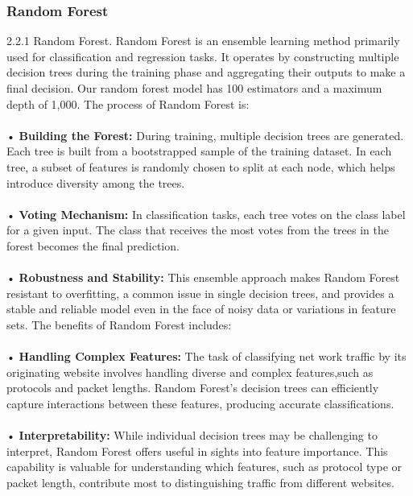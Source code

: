 \documentclass[10pt,sigconf,letterpaper,nonacm]{acmart}
\begin{document}
\subsubsection{Random Forest}
2.2.1 Random Forest. Random Forest is an ensemble learning method primarily used for classification and regression
tasks. It operates by constructing multiple decision trees during the training phase and aggregating their outputs to make
a final decision. Our random forest model has 100 estimators and a maximum depth of 1,000.
The process of Random Forest is:\\\\
• \textbf{Building the Forest:} During training, multiple decision
trees are generated. Each tree is built from a bootstrapped
sample of the training dataset. In each tree, a subset of
features is randomly chosen to split at each node, which
helps introduce diversity among the trees.\\\\
• \textbf{Voting Mechanism:} In classification tasks, each tree votes
on the class label for a given input. The class that receives
the most votes from the trees in the forest becomes the
final prediction.\\\\
• \textbf{Robustness and Stability:} This ensemble approach makes
Random Forest resistant to overfitting, a common issue
in single decision trees, and provides a stable and reliable
model even in the face of noisy data or variations in
feature sets.
The benefits of Random Forest includes:\\\\
• \textbf{Handling Complex Features:} The task of classifying net
work traffic by its originating website involves handling
diverse and complex features,such as protocols and packet
lengths. Random Forest’s decision trees can efficiently
capture interactions between these features, producing
accurate classifications.\\\\
• \textbf{Interpretability:} While individual decision trees may be
challenging to interpret, Random Forest offers useful in
sights into feature importance. This capability is valuable
for understanding which features, such as protocol type or packet length, contribute most to distinguishing traffic
from different websites.\\\\
\end{document}
